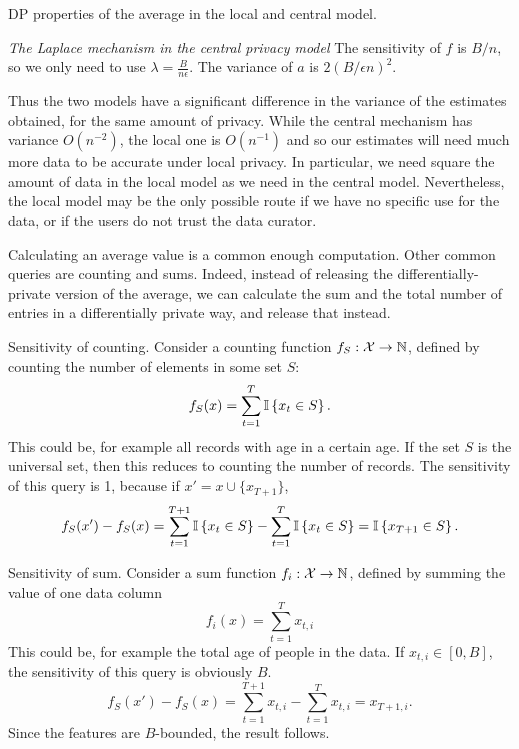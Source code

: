 \begin{frame}
\begin{exampleblock}{DP properties of the average in the local and central model.}
{      \emph{The Laplace mechanism in the central privacy model}
        The sensitivity of $f$ is $B / n$, so we only need to use $\lambda = \frac{B}{n \epsilon}$. The variance of $a$ is $2(B / \epsilon n)^2$. 

      Thus the two models have a significant difference in the variance of the estimates obtained, for the same amount of privacy. While the central mechanism has variance $O(n^{-2})$, the local one is $O(n^{-1})$ and so our estimates will need much more data to be accurate under local privacy. In particular, we need square the amount of data in the local model as we need in the central model. Nevertheless, the local model may be the only possible route if we have no specific use for the data, or if the users do not trust the data curator.
    }
    
  \end{exampleblock}

  Calculating an average value is a common enough computation. Other common queries are counting and sums. Indeed, instead of releasing the differentially-private version of the average, we can calculate the sum and the total number of entries in a differentially private way, and release that instead.

  \begin{example}{Sensitivity of counting.}
    Consider a counting function $f_S : {\mathcal{X}} \to {\mathbb{N}}$, defined by counting the number of elements in some set $S$:
    \[
      f_S(x) = \sum_{t=1}^T \mathop{\mbox{\ensuremath{\mathbb{I}}}}\left\{x_t \in S\right\}.
    \]
    This could be, for example all records with age in a certain age. If the set $S$ is the universal set, then this reduces to counting the number of records.
    The sensitivity of this query is 1, because if $x' = x \cup \{x_{T+1}\}$,
    \[
      f_S(x') - f_S(x) = \sum_{t=1}^{T+1} \mathop{\mbox{\ensuremath{\mathbb{I}}}}\left\{x_t \in S\right\} -  \sum_{t=1}^T \mathop{\mbox{\ensuremath{\mathbb{I}}}}\left\{x_t \in S\right\}
      = \mathop{\mbox{\ensuremath{\mathbb{I}}}}\left\{x_{T+1} \in S\right\}.
    \]
  \end{example}

  \begin{example}{Sensitivity of sum.}
    Consider a sum function $f_i : {\mathcal{X}} \to {\mathbb{N}}$, defined by summing the value of one data column
    \[
      f_i(x) = \sum_{t=1}^T x_{t,i}
    \]
    This could be, for example the total age of people in the data. If $x_{t,i} \in [0, B]$, the sensitivity of this query is obviously $B$.
    \[
      f_S(x') - f_S(x) = \sum_{t=1}^{T+1} x_{t,i}  -  \sum_{t=1}^T x_{t,i}
      = x_{T+1, i}.
    \]
    Since the features are $B$-bounded, the result follows.
  \end{example}


\end{frame}
